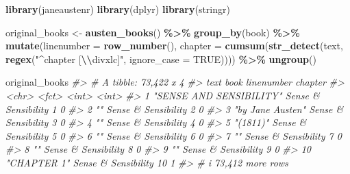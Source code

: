 \documentclass[
]{book}
\newenvironment{Shaded}{\begin{snugshade}}{\end{snugshade}}
\newcommand{\AttributeTok}[1]{\textcolor[rgb]{0.13,0.29,0.53}{#1}}
\newcommand{\CommentTok}[1]{\textcolor[rgb]{0.56,0.35,0.01}{\textit{#1}}}
\newcommand{\ConstantTok}[1]{\textcolor[rgb]{0.56,0.35,0.01}{#1}}
\newcommand{\FunctionTok}[1]{\textcolor[rgb]{0.13,0.29,0.53}{\textbf{#1}}}
\newcommand{\NormalTok}[1]{#1}
\newcommand{\OtherTok}[1]{\textcolor[rgb]{0.56,0.35,0.01}{#1}}
\newcommand{\SpecialCharTok}[1]{\textcolor[rgb]{0.81,0.36,0.00}{\textbf{#1}}}
\newcommand{\StringTok}[1]{\textcolor[rgb]{0.31,0.60,0.02}{#1}}
\begin{document}
\begin{Shaded}
\begin{Highlighting}[]
\FunctionTok{library}\NormalTok{(janeaustenr)}
\FunctionTok{library}\NormalTok{(dplyr)}
\FunctionTok{library}\NormalTok{(stringr)}

\NormalTok{original\_books }\OtherTok{\textless{}{-}} \FunctionTok{austen\_books}\NormalTok{() }\SpecialCharTok{\%\textgreater{}\%}
  \FunctionTok{group\_by}\NormalTok{(book) }\SpecialCharTok{\%\textgreater{}\%}
  \FunctionTok{mutate}\NormalTok{(}\AttributeTok{linenumber =} \FunctionTok{row\_number}\NormalTok{(),}
         \AttributeTok{chapter =} \FunctionTok{cumsum}\NormalTok{(}\FunctionTok{str\_detect}\NormalTok{(text, }
                                     \FunctionTok{regex}\NormalTok{(}\StringTok{"\^{}chapter [}\SpecialCharTok{\textbackslash{}\textbackslash{}}\StringTok{divxlc]"}\NormalTok{,}
                                           \AttributeTok{ignore\_case =} \ConstantTok{TRUE}\NormalTok{)))) }\SpecialCharTok{\%\textgreater{}\%}
  \FunctionTok{ungroup}\NormalTok{()}

\NormalTok{original\_books}
\CommentTok{\#\textgreater{} \# A tibble: 73,422 x 4}
\CommentTok{\#\textgreater{}    text                    book                linenumber chapter}
\CommentTok{\#\textgreater{}    \textless{}chr\textgreater{}                   \textless{}fct\textgreater{}                    \textless{}int\textgreater{}   \textless{}int\textgreater{}}
\CommentTok{\#\textgreater{}  1 "SENSE AND SENSIBILITY" Sense \& Sensibility          1       0}
\CommentTok{\#\textgreater{}  2 ""                      Sense \& Sensibility          2       0}
\CommentTok{\#\textgreater{}  3 "by Jane Austen"        Sense \& Sensibility          3       0}
\CommentTok{\#\textgreater{}  4 ""                      Sense \& Sensibility          4       0}
\CommentTok{\#\textgreater{}  5 "(1811)"                Sense \& Sensibility          5       0}
\CommentTok{\#\textgreater{}  6 ""                      Sense \& Sensibility          6       0}
\CommentTok{\#\textgreater{}  7 ""                      Sense \& Sensibility          7       0}
\CommentTok{\#\textgreater{}  8 ""                      Sense \& Sensibility          8       0}
\CommentTok{\#\textgreater{}  9 ""                      Sense \& Sensibility          9       0}
\CommentTok{\#\textgreater{} 10 "CHAPTER 1"             Sense \& Sensibility         10       1}
\CommentTok{\#\textgreater{} \# i 73,412 more rows}
\end{Highlighting}
\end{Shaded}
\end{document}
